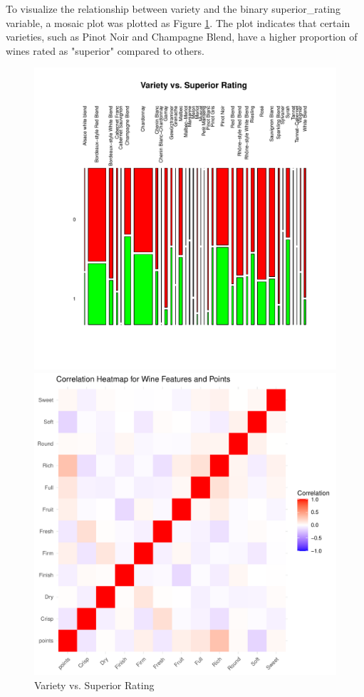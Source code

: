 \documentclass{article}
\begin{document}
To visualize the relationship between variety and the binary superior\_rating variable, a mosaic plot was plotted as Figure \ref{fig:variety_superior}. The plot indicates that certain varieties, such as Pinot Noir and Champagne Blend, have a higher proportion of wines rated as "superior" compared to others.
\begin{figure}[htbp]
	\centering
	\begin{minipage}{0.45\textwidth}
	\centering
	\includegraphics[width=\textwidth]{imgs/variety_superior.pdf}
	\caption{Variety vs. Superior Rating}
	\label{fig:variety_superior}
	\end{minipage}
	\hfill
	\begin{minipage}{0.45\textwidth}
	\centering
	\includegraphics[width=\textwidth]{imgs/corr_heatmap.pdf}

\end{minipage}
\end{figure}
\end{document}
